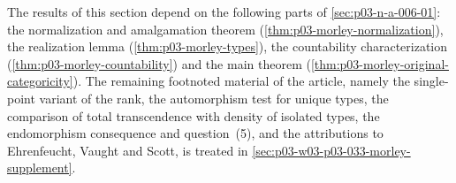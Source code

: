 The results of this section depend on the following parts of
\cref{sec:p03-n-a-006-01}: the normalization and amalgamation theorem
(\cref{thm:p03-morley-normalization}), the realization lemma
(\cref{thm:p03-morley-types}), the countability characterization
(\cref{thm:p03-morley-countability}) and the main theorem
(\cref{thm:p03-morley-original-categoricity}). The remaining footnoted
material of the article, namely the single-point variant of the rank, the
automorphism test for unique types, the comparison of total transcendence
with density of isolated types, the endomorphism consequence and
question~(5), and the attributions to Ehrenfeucht, Vaught and Scott, is
treated in \cref{sec:p03-w03-p03-033-morley-supplement}.

